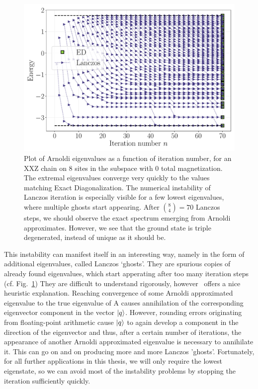 \begin{figure}[htbp]
	\centering
	\includegraphics[width=\linewidth]{Figures/lanczos_L_82.pdf}
	\caption{Plot of Arnoldi eigenvalues as a function of iteration number, for an XXZ chain on \(8\) sites in the
		subspace with \(0\) total magnetization. The extremal eigenvalues converge very quickly to the values matching
		Exact Diagonalization. The numerical instability of Lanczos iteration is especially visible for a few lowest
		eigenvalues, where multiple ghosts start appearing. After \(\binom{8}{4} = 70\) Lanczos steps,
		we should observe the exact spectrum emerging from Arnoldi approximates. However,
		we see that the ground state is triple degenerated, instead of unique as it should be.}
	\label{fig:ghosts}
\end{figure}

This instability can manifest itself in an interesting way, namely in the form of additional eigenvalues, called Lanczos `ghosts'.
They are spurious copies of already found eigenvalues, which start apperating after too many iteration steps (cf. Fig.~\ref{fig:ghosts})
They are difficult to understand rigorously, however~\textcite{Trefethen1997} offers a nice heuristic explanation.
Reaching convergence of some Arnoldi approximated eigenvalue to the true eigenvalue of A causes annihilation
of the corresponding eigenvector component in the vector \(\ket{q}\). However, rounding errors originating from
floating-point arithmetic cause \(\ket{q}\) to again develop a component in the direction of the eigenvector
and thus, after a certain number of iterations, the appearance of another Arnoldi approximated eigenvalue is necessary
to annihilate it. This can go on and on producing more and more Lanczos 'ghosts'.
Fortunately, for all further applications in this thesis, we will only require the lowest eigenstate, so we can
avoid most of the instability problems by stopping the iteration sufficiently quickly.

